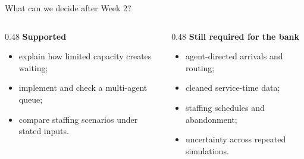 \documentclass{beamer}
\begin{document}
\begin{frame}{What can we decide after Week 2?}
  \begin{columns}[T,onlytextwidth]
    \begin{column}{0.48\textwidth}
      \textbf{Supported}
      \begin{itemize}
        \item explain how limited capacity creates waiting;
        \item implement and check a multi-agent queue;
        \item compare staffing scenarios under stated inputs.
      \end{itemize}
    \end{column}
    \begin{column}{0.48\textwidth}
      \textbf{Still required for the bank}
      \begin{itemize}
        \item agent-directed arrivals and routing;
        \item cleaned service-time data;
        \item staffing schedules and abandonment;
        \item uncertainty across repeated simulations.
      \end{itemize}
    \end{column}
  \end{columns}
\end{frame}
\end{document}
